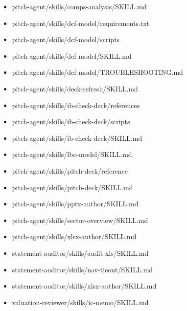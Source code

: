 \documentclass[11pt]{article}
\begin{document}
\begin{itemize}[leftmargin=*,itemsep=1pt,topsep=2pt]
\item \hspace*{2.7em}pitch-agent/skills/comps-analysis/SKILL.md
\item \hspace*{2.7em}pitch-agent/skills/dcf-model/requirements.txt
\item \hspace*{2.7em}pitch-agent/skills/dcf-model/scripts
\item \hspace*{2.7em}pitch-agent/skills/dcf-model/SKILL.md
\item \hspace*{2.7em}pitch-agent/skills/dcf-model/TROUBLESHOOTING.md
\item \hspace*{2.7em}pitch-agent/skills/deck-refresh/SKILL.md
\item \hspace*{2.7em}pitch-agent/skills/ib-check-deck/references
\item \hspace*{2.7em}pitch-agent/skills/ib-check-deck/scripts
\item \hspace*{2.7em}pitch-agent/skills/ib-check-deck/SKILL.md
\item \hspace*{2.7em}pitch-agent/skills/lbo-model/SKILL.md
\item \hspace*{2.7em}pitch-agent/skills/pitch-deck/reference
\item \hspace*{2.7em}pitch-agent/skills/pitch-deck/SKILL.md
\item \hspace*{2.7em}pitch-agent/skills/pptx-author/SKILL.md
\item \hspace*{2.7em}pitch-agent/skills/sector-overview/SKILL.md
\item \hspace*{2.7em}pitch-agent/skills/xlsx-author/SKILL.md
\item \hspace*{2.7em}statement-auditor/skills/audit-xls/SKILL.md
\item \hspace*{2.7em}statement-auditor/skills/nav-tieout/SKILL.md
\item \hspace*{2.7em}statement-auditor/skills/xlsx-author/SKILL.md
\item \hspace*{2.7em}valuation-reviewer/skills/ic-memo/SKILL.md

\end{itemize}
\end{document}
